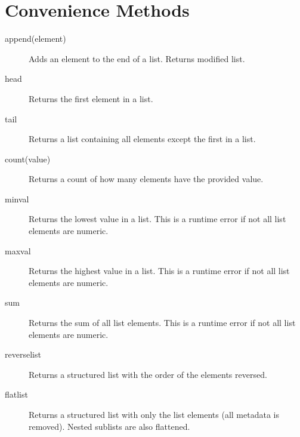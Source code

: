 \section{Convenience Methods}

\begin{description}
\item[append(element)]

Adds an element to the end of a list. Returns modified list.

\item[head]

Returns the first element in a list.

\item[tail]

Returns a list containing all elements except the first in a list.

\item[count(value)]

Returns a count of how many elements have the provided value.

\item[minval]

Returns the lowest value in a list. This is a runtime error if not all list elements are numeric.

\item[maxval]

Returns the highest value in a list. This is a runtime error if not all list elements are numeric.

\item[sum]

Returns the sum of all list elements. This is a runtime error if not all list elements are numeric.

\item[reverselist]

Returns a structured list with the order of the elements reversed.

\item[flatlist]

Returns a structured list with only the list elements (all metadata is
removed). Nested sublists are also flattened. 

\end{description}


